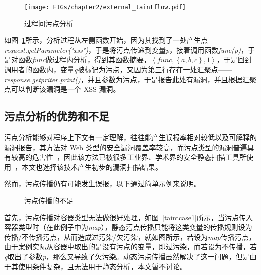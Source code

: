 \begin{figure}[!htbp]
	\centering
	\texttt{[image: FIGs/chapter2/external\_taintflow.pdf]}
	\caption{过程间污点分析}\label{externalflow}
\end{figure}

如图~\ref{externalflow}所示，分析过程从左侧函数开始，因为其找到了一处产生点——\textit{request.getParameter("xss")}，于是将污点传递到变量\textit{p}，接着调用函数\textit{func(p)}，于是对函数\textit{func}做过程内分析，得到其函数摘要，$\left\langle func, \left\{a, b, c\right\}, 1\right\rangle$，于是回到调用者的函数内，变量\textit{q}被标记为污点，又因为第三行存在一处汇聚点——\textit{response.getpriter.print()}，并且参数为污点，于是报告此处有漏洞，并且根据汇聚点可以判断该漏洞是一个 XSS 漏洞。

\subsection{污点分析的优势和不足}
污点分析能够对程序上下文有一定理解，往往能产生误报率相对较低以及可解释的漏洞报告，其方法对 Web 类型的安全漏洞覆盖率较高，而污点类型的漏洞普遍具有较高的危害性~\cite{taintStyle,aletheia}，因此该方法已被很多工业界、学术界的安全静态扫描工具所使用~\cite{taintStyle,taint:taj,pixy}，本文也选择该技术产生初步的漏洞扫描结果。

然而，污点传播仍有可能发生误报，以下通过简单示例来说明。

\begin{figure}[!htbp]
	\centering
	\caption{污点传播的不足}
	\label{fig:rq3} %
\end{figure}
首先，污点传播对容器类型无法做很好处理，如图~\ref{taintcase1}所示，当污点传入容器类型时（在此例子中为\textit{map}），静态污点传播只能将这类变量的传播规则设为传播/不传播污点，从而造成过污染/欠污染，就如图所示，若设为\textit{map}传播污点，由于案例实际从容器中取出的是没有污点的变量，即过污染，而若设为不传播，若\textit{q}取出了参数\textit{p}，那么又导致了欠污染。动态污点传播虽然解决了这一问题，但是由于其使用条件复杂，且无法用于静态分析，本文暂不讨论。

